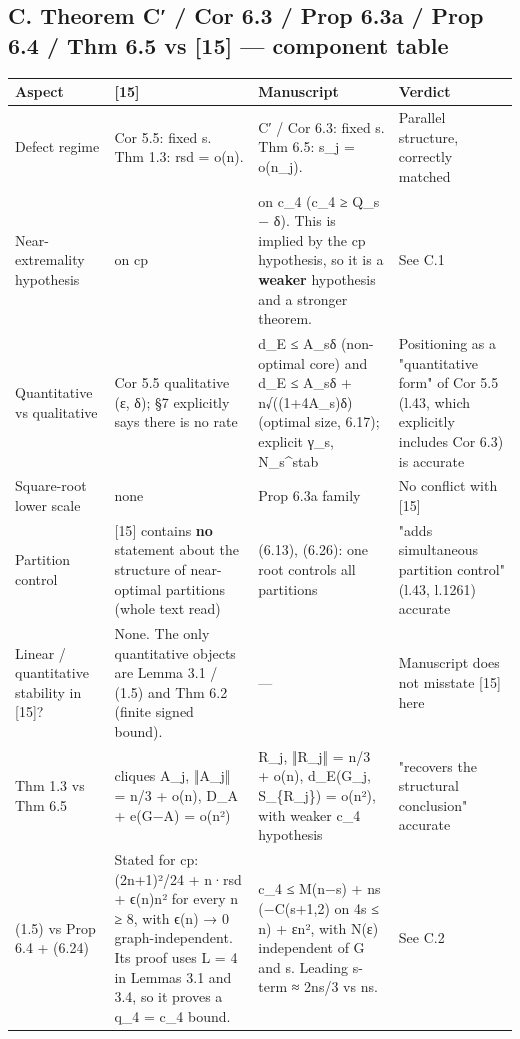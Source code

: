 \documentclass[
]{article}
\newcounter{none} %
\begin{document}
\subsection{C. Theorem C′ / Cor 6.3 / Prop 6.3a / Prop 6.4 / Thm 6.5 vs
{[}15{]} --- component
table}\label{c-theorem-c--cor-63--prop-63a--prop-64--thm-65-vs-15--component-table}

{\def\LTcaptype{none} %
\begin{longtable}[]{@{}llll@{}}
\toprule\noalign{}
Aspect & {[}15{]} & Manuscript & Verdict \\
\midrule\noalign{}
\endhead
\bottomrule\noalign{}
\endlastfoot
Defect regime & Cor 5.5: fixed s. Thm 1.3: rsd = o(n). & C′ / Cor 6.3:
fixed s. Thm 6.5: s\_j = o(n\_j). & Parallel structure, correctly
matched \\
Near-extremality hypothesis & on cp & on c\_4 (c\_4 ≥ Q\_s − δ). This is
implied by the cp hypothesis, so it is a \textbf{weaker} hypothesis and
a stronger theorem. & See C.1 \\
Quantitative vs qualitative & Cor 5.5 qualitative (ε, δ); §7 explicitly
says there is no rate & d\_E ≤ A\_sδ (non-optimal core) and d\_E ≤ A\_sδ
+ n√((1+4A\_s)δ) (optimal size, 6.17); explicit γ\_s, N\_s\^{}stab &
Positioning as a "quantitative form" of Cor 5.5 (l.43, which explicitly
includes Cor 6.3) is accurate \\
Square-root lower scale & none & Prop 6.3a family & No conflict with
{[}15{]} \\
Partition control & {[}15{]} contains \textbf{no} statement about the
structure of near-optimal partitions (whole text read) & (6.13), (6.26):
one root controls all partitions & "adds simultaneous partition control"
(l.43, l.1261) accurate \\
Linear / quantitative stability in {[}15{]}? & None. The only
quantitative objects are Lemma 3.1 / (1.5) and Thm 6.2 (finite signed
bound). & --- & Manuscript does not misstate {[}15{]} here \\
Thm 1.3 vs Thm 6.5 & cliques A\_j, ‖A\_j‖ = n/3 + o(n), D\_A + e(G−A) =
o(n²) & R\_j, ‖R\_j‖ = n/3 + o(n), d\_E(G\_j, S\_\{R\_j\}) = o(n²), with
weaker c\_4 hypothesis & "recovers the structural conclusion"
accurate \\
(1.5) vs Prop 6.4 + (6.24) & Stated for cp: (2n+1)²/24 + n·rsd + ϵ(n)n²
for every n ≥ 8, with ϵ(n) → 0 graph-independent. Its proof uses L = 4
in Lemmas 3.1 and 3.4, so it proves a q\_4 = c\_4 bound. & c\_4 ≤ M(n−s)
+ ns (−C(s+1,2) on 4s ≤ n) + εn², with N(ε) independent of G and s.
Leading s-term ≈ 2ns/3 vs ns. & See C.2 \\
\end{longtable}
}
\end{document}
